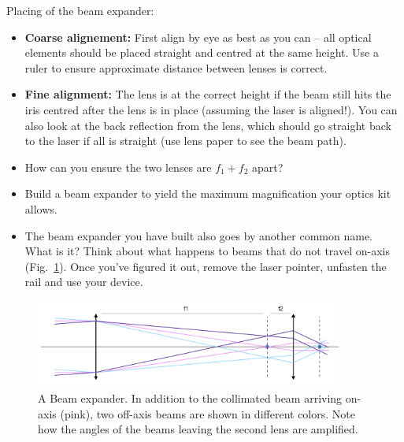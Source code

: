 \documentclass[a4paper]{report}
\begin{document}
	\noindent
	Placing of the beam expander:
	\begin{itemize}
	    \item \textbf{Coarse alignement:} First align by eye as best as you can -- all optical elements should be placed straight and centred at the same height. Use a ruler to ensure approximate distance between lenses is correct.
		\item \textbf{Fine alignment:} The lens is at the correct height if the beam still hits the iris centred after the lens is in place (assuming the laser is aligned!). You can also look at the back reflection from the lens, which should go straight back to the laser if all is straight (use lens paper to see the beam path).
		\item How can you ensure the two lenses are $f_1+f_2$ apart?
        \item Build a beam expander to yield the maximum magnification your optics kit allows.
		\item The beam expander you have built also goes by another common name.  What is it?
		Think about what happens to beams that do not travel on-axis (Fig.~\ref{fig:telescope}). Once you've figured it out, remove the laser pointer, unfasten the rail and use your device.
	\end{itemize}



	\begin{figure}[h]
		\center
		\includegraphics[width=0.9\textwidth]{figures/telescope.png}
		\captionsetup{width=0.9\textwidth}
		\caption{A Beam expander. In addition to the collimated beam arriving on-axis (pink), two off-axis beams are shown in different colors. Note how the angles of the beams leaving the second lens are amplified.}
		\label{fig:telescope}
	\end{figure}

	\clearpage

\end{document}
